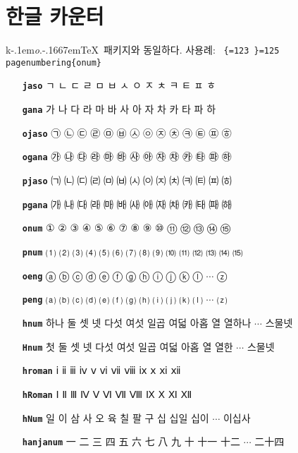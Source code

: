 \documentclass[dvipdfmx,b5paper]{article}
\def\cs#1{\texttt{\color{teal}\char92 \chardef\{=123 \chardef\}=125 #1}}
\def\koTeX{\textsf{k}\kern-.1em\textit{o}.\kern-.1667em\TeX}
\begin{document}
\section{한글 카운터}
\koTeX\ 패키지와 동일하다. 사용례: \cs{pagenumbering\{onum\}}
\begin{itemize}\leftskip=1cm =1em \itemsep=0pt plus0pt
      \def\cs#1{\texttt{\bfseries #1}}
  \item[\cs{jaso}] ㄱ ㄴ ㄷ ㄹ ㅁ ㅂ ㅅ ㅇ ㅈ ㅊ ㅋ ㅌ ㅍ ㅎ
  \item[\cs{gana}] 가 나 다 라 마 바 사 아 자 차 카 타 파 하
  \item[\cs{ojaso}] ㉠ ㉡ ㉢ ㉣ ㉤ ㉥ ㉦ ㉧ ㉨ ㉩ ㉪ ㉫ ㉬ ㉭
  \item[\cs{ogana}] ㉮ ㉯ ㉰ ㉱ ㉲ ㉳ ㉴ ㉵ ㉶ ㉷ ㉸ ㉹ ㉺ ㉻
  \item[\cs{pjaso}] ㈀ ㈁ ㈂ ㈃ ㈄ ㈅ ㈆ ㈇ ㈈ ㈉ ㈊ ㈋ ㈌ ㈍
  \item[\cs{pgana}] ㈎ ㈏ ㈐ ㈑ ㈒ ㈓ ㈔ ㈕ ㈖ ㈗ ㈘ ㈙ ㈚ ㈛
  \item[\cs{onum}]  ① ② ③ ④ ⑤ ⑥ ⑦ ⑧ ⑨ ⑩ ⑪ ⑫ ⑬ ⑭ ⑮
  \item[\cs{pnum}] ⑴ ⑵ ⑶ ⑷ ⑸ ⑹ ⑺ ⑻ ⑼ ⑽ ⑾ ⑿ ⒀ ⒁ ⒂
  \item[\cs{oeng}] ⓐ ⓑ ⓒ ⓓ ⓔ ⓕ ⓖ ⓗ ⓘ ⓙ ⓚ ⓛ $\cdots$ ⓩ
  \item[\cs{peng}] ⒜ ⒝ ⒞ ⒟ ⒠ ⒡ ⒢ ⒣ ⒤ ⒥ ⒦ ⒧ $\cdots$ ⒵
  \item[\cs{hnum}] 하나 둘 셋 넷 다섯 여섯 일곱 여덟 아홉 열 열하나 $\cdots$ 스물넷
  \item[\cs{Hnum}] 첫 둘 셋 넷 다섯 여섯 일곱 여덟 아홉 열 열한 $\cdots$ 스물넷
  \item[\cs{hroman}] ⅰ ⅱ ⅲ ⅳ ⅴ ⅵ ⅶ ⅷ ⅸ ⅹ ⅺ ⅻ
  \item[\cs{hRoman}] Ⅰ Ⅱ Ⅲ Ⅳ Ⅴ Ⅵ Ⅶ Ⅷ Ⅸ Ⅹ Ⅺ Ⅻ
  \item[\cs{hNum}] 일 이 삼 사 오 육 칠 팔 구 십 십일 십이 $\cdots$ 이십사
  \item[\cs{hanjanum}] 一 二 三 四 五 六 七 八 九 十 十一 十二 $\cdots$ 二十四
\end{itemize}
\end{document}
